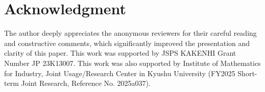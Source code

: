 \documentclass{amsart}
\numberwithin{equation}{section}
\begin{document}
\begin{itemize}
\end{itemize}











\section*{Acknowledgment}
The author deeply appreciates the anonymous reviewers for their careful reading and constructive comments, which significantly improved the presentation and clarity of this paper.
This work was supported by JSPS KAKENHI Grant Number JP	23K13007.
This work was also supported by Institute of Mathematics for Industry, Joint Usage/Research Center in Kyushu University (FY2025 Short-term Joint Research, Reference No. 2025a037).
\end{document}
